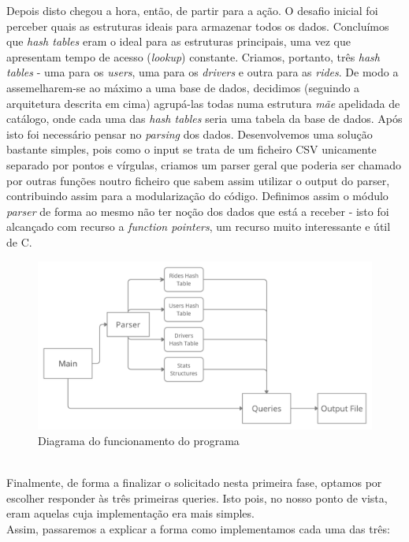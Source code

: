 \documentclass[12pt,a4paper]{report}
\begin{document}
    Depois disto chegou a hora, então, de partir para a ação. O desafio inicial foi perceber quais as estruturas ideais para armazenar todos os dados. Concluímos que \textit{hash tables} eram o ideal para as estruturas principais, uma vez que apresentam tempo de acesso (\textit{lookup}) constante. Criamos, portanto, três \textit{hash tables} - uma para os \textit{users}, uma para os \textit{drivers} e outra para as \textit{rides}. De modo a assemelharem-se ao máximo a uma base de dados, decidimos (seguindo a arquitetura descrita em cima) agrupá-las todas numa estrutura \textit{mãe} apelidada de catálogo, onde cada uma das \textit{hash tables} seria uma tabela da base de dados. Após isto foi necessário pensar no \textit{parsing} dos dados. Desenvolvemos uma solução bastante simples, pois como o input se trata de um ficheiro CSV unicamente separado por pontos e vírgulas, criamos um parser geral que poderia ser chamado por outras funções noutro ficheiro que sabem assim utilizar o output do parser, contribuindo assim para a modularização do código. Definimos assim o módulo \textit{parser} de forma ao mesmo não ter noção dos dados que está a receber - isto foi alcançado com recurso a \textit{function pointers}, um recurso muito interessante e útil de C. \\
    \begin{figure}[h]
    \includegraphics[scale = 0.15]{diagram2.png}
    \centering
    \caption{Diagrama do funcionamento do programa}
    \end{figure} \\
    Finalmente, de forma a finalizar o solicitado nesta primeira fase, optamos por escolher responder às três primeiras queries. Isto pois, no nosso ponto de vista, eram aquelas cuja implementação era mais simples. \\
    Assim, passaremos a explicar a forma como implementamos cada uma das três: \\
\end{document}
